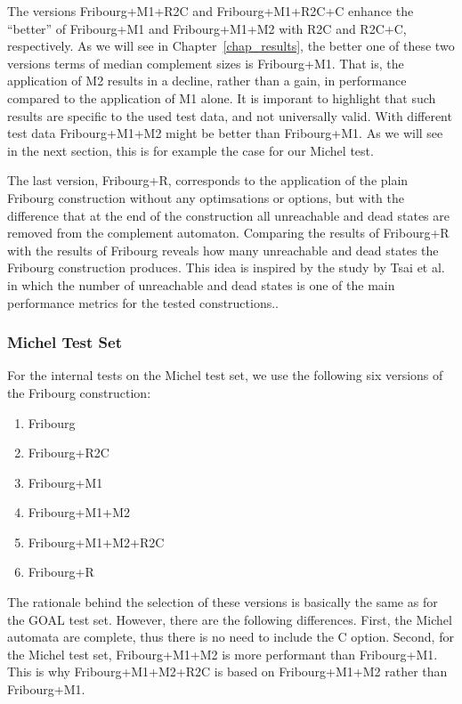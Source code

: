The versions Fribourg+M1+R2C and Fribourg+M1+R2C+C enhance the ``better'' of Fribourg+M1 and Fribourg+M1+M2 with R2C and R2C+C, respectively. As we will see in Chapter~\ref{chap_results}, the better one of these two versions terms of median complement sizes is Fribourg+M1. That is, the application of M2 results in a decline, rather than a gain, in performance compared to the application of M1 alone. It is imporant to highlight that such results are specific to the used test data, and not universally valid. With different test data Fribourg+M1+M2 might be better than Fribourg+M1. As we will see in the next section, this is for example the case for our Michel test.

The last version, Fribourg+R, corresponds to the application of the plain Fribourg construction without any optimsations or options, but with the difference that at the end of the construction all unreachable and dead states are removed from the complement automaton. Comparing the results of Fribourg+R with the results of Fribourg reveals how many unreachable and dead states the Fribourg construction produces. This idea is inspired by the study by Tsai et al.~\cite{2011_tsai} in which the number of unreachable and dead states is one of the main performance metrics for the tested constructions..

\subsubsection{Michel Test Set}
For the internal tests on the Michel test set, we use the following six versions of the Fribourg construction:
\begin{enumerate}
\item Fribourg
\item Fribourg+R2C
\item Fribourg+M1
\item Fribourg+M1+M2
\item Fribourg+M1+M2+R2C
\item Fribourg+R
\end{enumerate}

The rationale behind the selection of these versions is basically the same as for the GOAL test set. However, there are the following differences. First, the Michel automata are complete, thus there is no need to include the C option. Second, for the Michel test set, Fribourg+M1+M2 is more performant than Fribourg+M1. This is why Fribourg+M1+M2+R2C is based on Fribourg+M1+M2 rather than Fribourg+M1.


